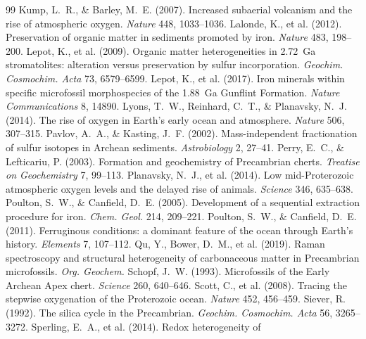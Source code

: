 \documentclass[11pt]{article}
\begin{document}
\begin{thebibliography}{99}
 Kump, L.~R., \& Barley, M.~E. (2007). Increased subaerial
volcanism and the rise of atmospheric oxygen. \textit{Nature} 448, 1033--1036.
 Lalonde, K., et al. (2012). Preservation of organic
matter in sediments promoted by iron. \textit{Nature} 483, 198--200.
 Lepot, K., et al. (2009). Organic matter heterogeneities in
2.72~Ga stromatolites: alteration versus preservation by sulfur incorporation. \textit{Geochim.
Cosmochim. Acta} 73, 6579--6599.
 Lepot, K., et al. (2017). Iron minerals within specific
microfossil morphospecies of the 1.88~Ga Gunflint Formation. \textit{Nature Communications} 8, 14890.
 Lyons, T.~W., Reinhard, C.~T., \& Planavsky, N.~J. (2014).
The rise of oxygen in Earth's early ocean and atmosphere. \textit{Nature} 506, 307--315.
 Pavlov, A.~A., \& Kasting, J.~F. (2002).
Mass-independent fractionation of sulfur isotopes in Archean sediments. \textit{Astrobiology} 2,
27--41.
 Perry, E.~C., \& Lefticariu, P. (2003). Formation and
geochemistry of Precambrian cherts. \textit{Treatise on Geochemistry} 7, 99--113.
 Planavsky, N.~J., et al. (2014). Low
mid-Proterozoic atmospheric oxygen levels and the delayed rise of animals. \textit{Science} 346,
635--638.
 Poulton, S.~W., \& Canfield, D.~E. (2005).
Development of a sequential extraction procedure for iron. \textit{Chem. Geol.} 214, 209--221.
 Poulton, S.~W., \& Canfield, D.~E. (2011).
Ferruginous conditions: a dominant feature of the ocean through Earth's history. \textit{Elements}
7, 107--112.
 Qu, Y., Bower, D.~M., et al. (2019). Raman spectroscopy and
structural heterogeneity of carbonaceous matter in Precambrian microfossils. \textit{Org. Geochem.}
 Schopf, J.~W. (1993). Microfossils of the Early Archean Apex
chert. \textit{Science} 260, 640--646.
 Scott, C., et al. (2008). Tracing the stepwise oxygenation
of the Proterozoic ocean. \textit{Nature} 452, 456--459.
 Siever, R. (1992). The silica cycle in the Precambrian.
\textit{Geochim. Cosmochim. Acta} 56, 3265--3272.
 Sperling, E.~A., et al. (2014). Redox heterogeneity of

\end{thebibliography}
\end{document}
